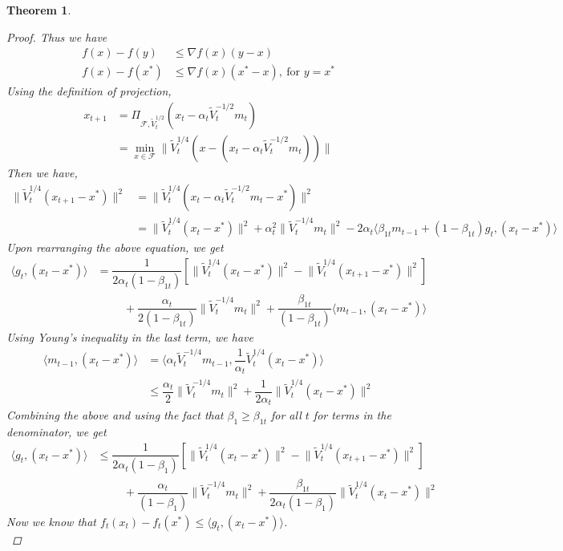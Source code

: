 \documentclass[12pt]{article}
\newtheorem{thm}{Theorem}[section]
\begin{document}
\begin{thm}
\begin{proof}
Thus we have
\begin{align*}
    f(x) - f(y) &\leq \nabla f(x)(y - x) \\
    f(x) - f(x^*) &\leq \nabla f(x)(x^* - x),\ \text{for } y=x^*
\end{align*}
Using the definition of projection,
\begin{align*}
    x_{t+1} &= \Pi_{\mathcal{F}, \tilde{V}_t^{1/2}}
    \left(x_t - \alpha_t\tilde{V}_t^{-1/2}m_t \right)\\
    &= \min_{x \in \mathcal{F}}\lVert \tilde{V}_t^{1/4}(x - (x_t - \alpha_t\tilde{V}_t^{-1/2}m_t)) \rVert
\end{align*}
Then we have,
\begin{align*}
    \lVert \tilde{V}_{t}^{1/4}(x_{t+1} - x^{*})\rVert^{2} 
    &= \lVert \tilde{V}_t^{1/4}(x_t  - \alpha_t\tilde{V}_t^{-1/2}m_t - x^{*}) \rVert^2 \\
    &= \lVert \tilde{V}_{t}^{1/4}(x_{t} - x^{*})\rVert^2 + \alpha_t^{2} \lVert\tilde{V}_{t}^{-1/4}m_{t}\rVert^2  
     -2\alpha_{t}\langle \beta_{1t}m_{t-1} +
    (1-\beta_{1t})g_{t}, (x_{t} - x^{*})\rangle 
\end{align*}
Upon rearranging the above equation, we get
\begin{align*}
    \langle g_{t}, (x_{t} - x^{*}) \rangle &= \dfrac{1}{2\alpha_{t}(1-\beta_{1t})}\left[\lVert \tilde{V}_{t}^{1/4}(x_{t} - x^{*})\rVert^2 - \lVert \tilde{V}_{t}^{1/4}(x_{t+1} - x^{*})\rVert^2\right] \\ & \hspace{1cm}+\dfrac{\alpha_{t}}{2(1-\beta_{1t})}\lVert\tilde{V}_{t}^{-1/4}m_{t}\rVert^2 + \dfrac{\beta_{1t}}{(1-\beta_{1t})}\langle m_{t-1}, (x_{t} - x^{*}) \rangle
    \end{align*}
    Using Young's inequality in the last term, we have
    \begin{align*}
\langle m_{t-1}, (x_{t} - x^{*}) \rangle &= \langle \alpha_t \tilde{V}_t^{-1/4} m_{t-1}, \dfrac{1}{\alpha_t}\tilde{V}_t^{1/4}(x_{t} - x^{*}) \rangle \\
    &\leq \dfrac{\alpha_{t}}{2}\lVert\tilde{V}_{t}^{-1/4}m_{t}\rVert^2 
+\dfrac{1}{2\alpha_t}\lVert \tilde{V}_{t}^{1/4}(x_{t} - x^{*})\rVert^2 
\end{align*}
Combining the above and using the fact that $\beta_1\geq \beta_{1t}$ for all $t$ for terms in the denominator, we get
\begin{align*}
\langle g_t, (x_t-x^*)\rangle &\leq  \dfrac{1}{2\alpha_{t}(1-\beta_{1})}\left[\lVert \tilde{V}_{t}^{1/4}(x_{t} - x^{*})\rVert^2 - \lVert \tilde{V}_{t}^{1/4}(x_{t+1} - x^{*})\rVert^2\right] \\
    &\hspace{1cm}+\dfrac{\alpha_{t}}{(1-\beta_{1})}\lVert\tilde{V}_{t}^{-1/4}m_{t}\rVert^2 + \dfrac{\beta_{1t}}{2\alpha_{t}(1-\beta_{1})}\lVert \tilde{V}_{t}^{1/4}(x_{t} - x^{*})\rVert^2
\end{align*}
Now we know that $f_{t}(x_{t}) - f_{t}(x^{*}) \leq \langle g_t, (x_{t} - x^{*})\rangle$.\\


\end{proof}
\end{thm}
\end{document}
